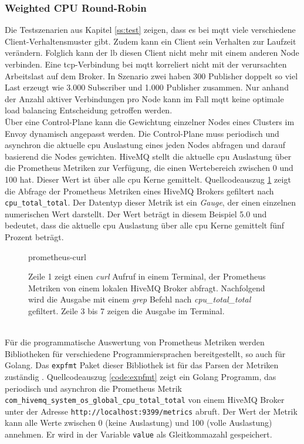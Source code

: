 \subsubsection{Weighted CPU Round-Robin} \label{ss:weighted-cpu}
Die Testszenarien aus Kapitel \ref{ss:test} zeigen, dass es bei \ac{mqtt} viele verschiedene Client-Verhaltensmuster gibt. Zudem kann ein Client sein Verhalten zur Laufzeit verändern.
Folglich kann der \acl{lb} diesen Client nicht mehr mit einem anderen Node verbinden.
Eine \ac{tcp}-Verbindung bei \ac{mqtt} korreliert nicht mit der verursachten Arbeitslast auf dem Broker. In Szenario zwei haben 300 Publisher doppelt so viel Last erzeugt wie 3.000 Subscriber und 1.000 Publisher zusammen.
Nur anhand der Anzahl aktiver Verbindungen pro Node kann im Fall \ac{mqtt} keine optimale load balancing Entscheidung getroffen werden.
\\
Über eine Control-Plane kann die Gewichtung einzelner Nodes eines Clusters im Envoy dynamisch angepasst werden.
Die Control-Plane muss periodisch und asynchron die aktuelle \ac{cpu} Auslastung eines jeden Nodes abfragen und darauf basierend die Nodes gewichten.
HiveMQ stellt die aktuelle \ac{cpu} Auslastung über die Prometheus Metriken zur Verfügung, die einen Wertebereich zwischen 0 und 100 hat. Dieser Wert ist über alle \ac{cpu} Kerne gemittelt.
Quellcodeauszug \ref{code:prometheus-curl} zeigt die Abfrage der Prometheus Metriken eines HiveMQ Brokers gefiltert nach \verb|cpu_total_total|. Der Datentyp dieser Metrik ist ein \textit{Gauge}, der einen einzelnen numerischen Wert darstellt.\cite{prometheusMetricTypesPrometheus} Der Wert beträgt in diesem Beispiel 5.0 und bedeutet, dass die aktuelle \ac{cpu} Auslastung über alle \ac{cpu} Kerne gemittelt fünf Prozent beträgt.
\begin{figure}
    {prometheus-curl}
    \caption{Zeile 1 zeigt einen \textit{curl} Aufruf in einem Terminal, der Prometheus Metriken von einem lokalen HiveMQ Broker abfragt. Nachfolgend wird die Ausgabe mit einem \textit{grep} Befehl nach \textit{cpu\_total\_total} gefiltert. Zeile 3 bis 7 zeigen die Ausgabe im Terminal.}
    \label{code:prometheus-curl}
\end{figure}
\\
Für die programmatische Auswertung von Prometheus Metriken werden Bibliotheken für verschiedene Programmiersprachen bereitgestellt, so auch für Golang.
Das \verb|expfmt| Paket dieser Bibliothek ist für das Parsen der Metriken zuständig \cite{ExpfmtPkgGo}.
Quellcodeauszug \ref{code:expfmt} zeigt ein Golang Programm, das periodisch und asynchron die Prometheus Metrik \verb|com_hivemq_system_os_global_cpu_total_total| von einem HiveMQ Broker unter der Adresse \verb|http://localhost:9399/metrics| abruft. Der Wert der Metrik kann alle Werte zwischen 0 (keine Auslastung) und 100 (volle Auslastung) annehmen. Er wird in der Variable \verb|value| als Gleitkommazahl gespeichert.
